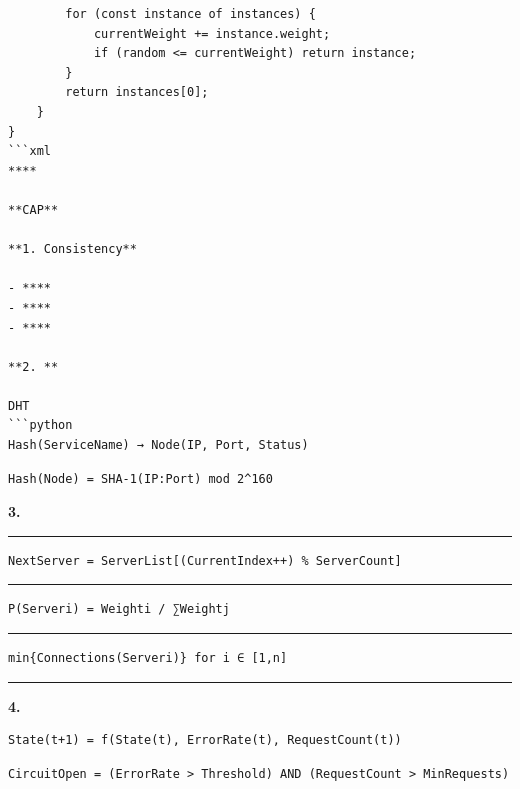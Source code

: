 \begin{verbatim}
        for (const instance of instances) {
            currentWeight += instance.weight;
            if (random <= currentWeight) return instance;
        }
        return instances[0];
    }
}
```xml
****

**CAP**

**1. Consistency**

- ****
- ****
- ****

**2. **

DHT
```python
Hash(ServiceName) → Node(IP, Port, Status)
\end{verbatim}

\begin{verbatim}
Hash(Node) = SHA-1(IP:Port) mod 2^160
\end{verbatim}

\textbf{3. }

\begin{center}\rule{0.5\linewidth}{0.5pt}\end{center}

\begin{verbatim}
NextServer = ServerList[(CurrentIndex++) % ServerCount]
\end{verbatim}

\begin{center}\rule{0.5\linewidth}{0.5pt}\end{center}

\begin{verbatim}
P(Serveri) = Weighti / ∑Weightj
\end{verbatim}

\begin{center}\rule{0.5\linewidth}{0.5pt}\end{center}

\begin{verbatim}
min{Connections(Serveri)} for i ∈ [1,n]
\end{verbatim}

\begin{center}\rule{0.5\linewidth}{0.5pt}\end{center}

\textbf{4. }

\begin{verbatim}
State(t+1) = f(State(t), ErrorRate(t), RequestCount(t))
\end{verbatim}

\begin{verbatim}
CircuitOpen = (ErrorRate > Threshold) AND (RequestCount > MinRequests)
\end{verbatim}

